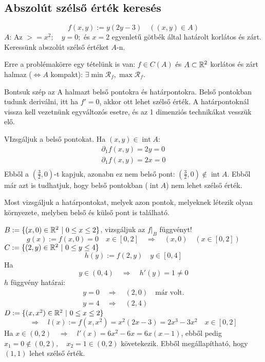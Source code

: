 \documentclass[a4paper,11.5pt]{article}
\DeclareMathOperator{\Int}{int}
\begin{document}
	\subsection{Abszolút szélső érték keresés}
	\begin{task}
		\[ f(x,y):=y(2y-3)\quad ((x,y)\in A) \]
		$A$: Az $>=x^2;\quad y=0;$ és $x=2$ egyenletű götbék által határolt korlátos és zárt. Keressünk abszolút szélső értéket $A$-n.
		
		Erre a problémakörre egy tételünk is van: $f\in C(A)$ és $A\subset\mathbb{R}^2$ korlátos és zárt halmaz ($\Leftrightarrow A$ kompakt): $\exists\min\mathcal{R}_f, \max\mathcal{R}_f$.
		
		Bontsuk szép az A halmazt belső pontokra és határpontokra. Belső pontokban tudunk deriválni, itt ha $f'=0$, akkor ott lehet szélső érték. A határpontoknál vissza kell vezetnünk egyváltozós esetre, és az 1 dimenziós technikákat vesszük elő.
		
		\medskip
		VIzsgáljuk a belső pontokat. Ha $(x,y)\in\Int A$:
		\begin{align*}
			\partial_1f(x,y)=2y=0\\
			\partial_1f(x,y)=2x=0\\
		\end{align*}
		Ebből a $\left(\frac{3}{2},0\right)$-t kapjuk, azonabn ez nem belső pont: $\left(\frac{3}{2},0\right)\notin\Int A$. Ebből már azt is tudhatjuk, hogy belső pontokban ($\Int A$) nem lehet szélső érték.
		\medskip
		
		Most vizsgáljuk a határpontokat, melyek azon pontok, melyeknek létezik olyan környezete, melyben belső és külső pont is található.
		
		$B:=\{(x,0)\in\mathbb{R}^2\ |\ 0\leq x\leq 2 \}$, vizsgáljuk az $f\big|_B$ függvényt!
		\[ g(x):=f(x,0)=0\quad x\in[0,2]\quad \Rightarrow\quad (x,0)\quad (x\in[0,2]) \]
		$C:=\{ (2,y)\in\mathbb{R}^2\ | \ 0\leq y\leq 4 \}$
		\[ h(y):=f(2,y)\quad y\in[0,4] \]
		Ha 
		\[ y\in(0,4)\quad \Rightarrow\quad h'(y)=1\not=0 \]
		$h$ függvény határai: 
		\begin{align*}
			y=0\quad \Rightarrow\quad (2,0) \quad \text{már volt.}\\
			y=4\quad \Rightarrow\quad (2,4)
		\end{align*}
		$D:=\{(x,x^2)\in\mathbb{R}^2\ | \ 0\leq x\leq 2\}$
		\[ \Rightarrow\quad l(x):=f(x,x^2)=x^2(2x-3)=2x^3-3x^2\quad x\in[0,2] \]
		Ha $x\in(0,2)\quad \Rightarrow\quad l'(x)=6x^2-6x=6x(x-1)$, ebből pedig $x_1=0\notin(0,2), \quad x_2=1\in(0,2)$ követekezik. Ebből megállapítható, hogy $(1,1)$ lehet szélső érték.
		

\end{task}
\end{document}
